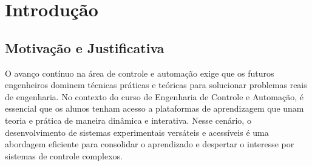 \chapter{Introdução}
\label{chap:intro} %





\section{Motivação e Justificativa}
\label{sec:motivacao}

O avanço contínuo na área de controle e automação exige que os futuros engenheiros dominem técnicas práticas e teóricas para solucionar problemas reais de engenharia. No contexto do curso de Engenharia de Controle e Automação, é essencial que os alunos tenham acesso a plataformas de aprendizagem que unam teoria e prática de maneira dinâmica e interativa. Nesse cenário, o desenvolvimento de sistemas experimentais versáteis e acessíveis é uma abordagem eficiente para consolidar o aprendizado e despertar o interesse por sistemas de controle complexos.

